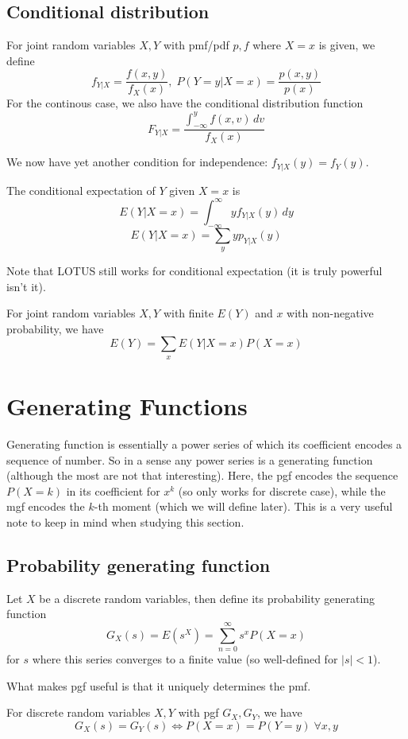 \documentclass[11pt]{article}
\begin{document}
\subsection{Conditional distribution}
\begin{definition}
  For joint random variables \(X,Y\) with pmf/pdf \(p,f\) where \(X=x\) is given, we define
  \[f_{Y|X}=\frac{f(x,y)}{f_X(x)}, \; P(Y=y|X=x)=\frac{p(x,y)}{p(x)}\]
  For the continous case, we also have the conditional distribution function 
  \[F_{Y|X}=\frac{\int_{-\infty}^{y}f(x,v)\,dv}{f_X(x)}\]
\end{definition}

We now have yet another condition for independence: \(f_{Y|X}(y)=f_Y(y)\).

\begin{definition}
  The conditional expectation of \(Y\) given \(X=x\) is 
  \[E(Y|X=x)=\int_{-\infty}^{\infty}yf_{Y|X}(y)\,dy\]
  \[E(Y|X=x)=\sum_y yp_{Y|X}(y)\]
\end{definition}
Note that LOTUS still works for conditional expectation (it is truly powerful isn't it).

\begin{theorem}
  For joint random variables \(X,Y\) with finite \(E(Y)\) and \(x\) with non-negative probability, we have
  \[E(Y)=\sum_x E(Y|X=x)P(X=x)\]
\end{theorem}

\section{Generating Functions}
Generating function is essentially a power series of which its coefficient encodes a sequence of number. So in a sense any power series is a generating function (although the most are not that interesting). Here, the pgf encodes the sequence \(P(X=k)\) in its coefficient for \(x^k\) (so only works for discrete case), while the mgf encodes the \(k\)-th moment (which we will define later). This is a very useful note to keep in mind when studying this section.
\subsection{Probability generating function}
\begin{definition}
  Let \(X\) be a discrete random variables, then define its probability generating function
  \[G_X(s)=E(s^X)=\sum_{n=0}^{\infty}s^xP(X=x)\]
  for \(s\) where this series converges to a finite value (so well-defined for \(|s|<1\)).
\end{definition}
What makes pgf useful is that it uniquely determines the pmf.
\begin{theorem}
  For discrete random variables \(X,Y\) with pgf \(G_X,G_Y\), we have
  \[G_X(s)=G_Y(s) \iff P(X=x)=P(Y=y)\; \forall x,y\]
\end{theorem}
\end{document}
